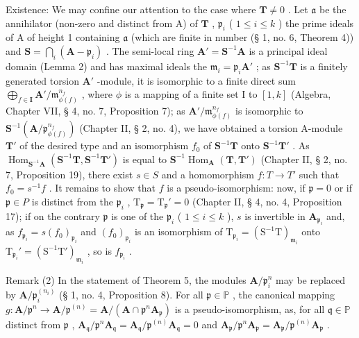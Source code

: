 Existence: We may confine our attention to the case where \(\mathbf{T} \neq 0\) . Let \(\mathfrak{a}\) be the annihilator (non-zero and distinct from A) of \(\mathbf{T}\) , \(\mathfrak{p}_i\) ( \(1 \leqslant i \leqslant k\) ) the prime ideals of A of height 1 containing \(\mathfrak{a}\) (which are finite in number (§ 1, no. 6, Theorem 4)) and \(\mathbf{S} = \bigcap_i (\mathbf{A} - \mathfrak{p}_i)\) . The semi-local ring \(\mathbf{A}' = \mathbf{S}^{-1}\mathbf{A}\) is a principal ideal domain (Lemma 2) and has maximal ideals the \(\mathfrak{m}_i = \mathfrak{p}_i\mathbf{A}'\) ; as \(\mathbf{S}^{-1}\mathbf{T}\) is a finitely generated torsion \(\mathbf{A}'\) -module, it is isomorphic to a finite direct sum \(\bigoplus_{f \in \mathbf{I}} \mathbf{A}' / \mathfrak{m}_{\phi(f)}^{n_f}\) , where \(\phi\) is a mapping of a finite set I to \([1, k]\) (Algebra, Chapter VII, § 4, no. 7, Proposition 7); as \(\mathbf{A}' / \mathfrak{m}_{\phi(f)}^{n_f}\) is isomorphic to \(\mathbf{S}^{-1}(\mathbf{A} / \mathfrak{p}_{\phi(f)}^{n_f})\) (Chapter II, § 2, no. 4), we have obtained a torsion A-module \(\mathbf{T}'\) of the desired type and an isomorphism \(f_0\) of \(\mathbf{S}^{-1}\mathbf{T}\) onto \(\mathbf{S}^{-1}\mathbf{T}'\) . As \(\operatorname{Hom}_{\mathbf{S}^{-1}\mathbf{A}}(\mathbf{S}^{-1}\mathbf{T}, \mathbf{S}^{-1}\mathbf{T}')\) is equal to \(\mathbf{S}^{-1}\operatorname{Hom}_{\mathbf{A}}(\mathbf{T}, \mathbf{T}')\) (Chapter II, § 2, no. 7, Proposition 19), there exist \(s \in S\) and a homomorphism \(f: T \to T'\) such that \(f_0 = s^{-1}f\) . It remains to show that \(f\) is a pseudo-isomorphism: now, if \(\mathfrak{p} = 0\) or if \(\mathfrak{p} \in P\) is distinct from the \(\mathfrak{p}_i\) , \(\mathrm{T}_{\mathfrak{p}} = \mathrm{T}_{\mathfrak{p}}' = 0\) (Chapter II, § 4, no. 4, Proposition 17); if on the contrary \(\mathfrak{p}\) is one of the \(\mathfrak{p}_i\) ( \(1 \leqslant i \leqslant k\) ), \(s\) is invertible in \(\mathbf{A}_{\mathfrak{p}_i}\) and, as \(f_{\mathfrak{p}_i} = s(f_0)_{\mathfrak{p}_i}\) and \((f_0)_{\mathfrak{p}_i}\) is an isomorphism of \(\mathrm{T}_{\mathfrak{p}_i} = (\mathrm{S}^{-1}\mathrm{T})_{\mathfrak{m}_i}\) onto \(\mathrm{T}_{\mathfrak{p}_i}' = (\mathrm{S}^{-1}\mathrm{T}')_{\mathfrak{m}_i}\) , so is \(f_{\mathfrak{p}_i}\) .

Remark (2) In the statement of Theorem 5, the modules \(\mathbf{A} / \mathfrak{p}_i^n\) may be replaced by \(\mathbf{A} / \mathfrak{p}_i^{(n_i)}\) (§ 1, no. 4, Proposition 8). For all \(\mathfrak{p} \in \mathbb{P}\) , the canonical mapping \(g\colon \mathbf{A} / \mathfrak{p}^n \to \mathbf{A} / \mathfrak{p}^{(n)} = \mathbf{A} / (\mathbf{A} \cap \mathfrak{p}^n \mathbf{A}_{\mathfrak{p}})\) is a pseudo-isomorphism, as, for all \(\mathfrak{q} \in \mathbb{P}\) distinct from \(\mathfrak{p}\) , \(\mathbf{A}_{\mathfrak{q}} / \mathfrak{p}^n \mathbf{A}_{\mathfrak{q}} = \mathbf{A}_{\mathfrak{q}} / \mathfrak{p}^{(n)} \mathbf{A}_{\mathfrak{q}} = 0\) and \(\mathbf{A}_{\mathfrak{p}} / \mathfrak{p}^n \mathbf{A}_{\mathfrak{p}} = \mathbf{A}_{\mathfrak{p}} / \mathfrak{p}^{(n)} \mathbf{A}_{\mathfrak{p}}\) .

